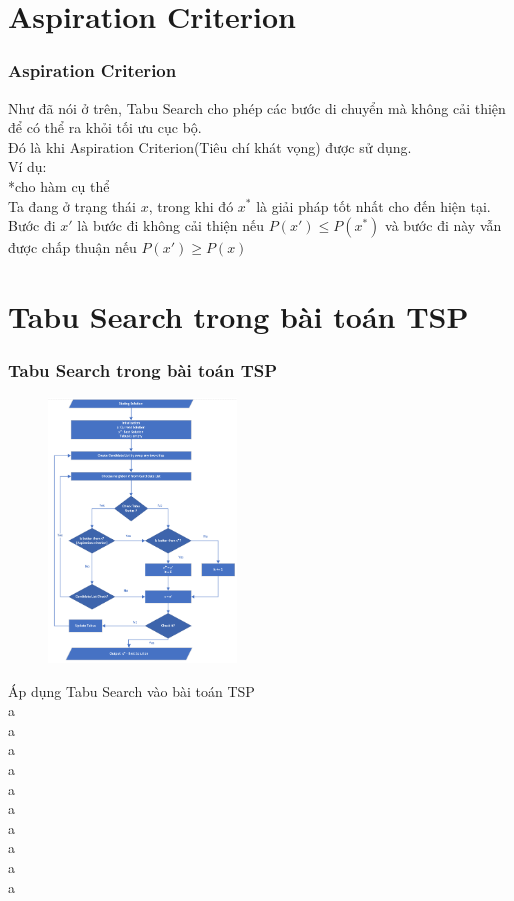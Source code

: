 \documentclass[12pt]{beamer}
\begin{document}
	\section{Aspiration Criterion}
	\begin{frame}
		\frametitle{Aspiration Criterion}
		Như đã nói ở trên, Tabu Search cho phép các bước di chuyển mà không cải thiện để có thể ra khỏi tối ưu cục bộ.\\
		Đó là khi Aspiration Criterion(Tiêu chí khát vọng) được sử dụng.\\
		Ví dụ:\\
		*cho hàm cụ thể\\
		Ta đang ở trạng thái $x$, trong khi đó $x^*$ là giải pháp tốt nhất cho đến hiện tại.\\
		Bước đi $x'$ là bước đi không cải thiện nếu $P(x') \le P(x^*)$ và bước đi này vẫn được chấp thuận nếu $P(x') \ge P(x)$
	\end{frame}

	\section{Tabu Search trong bài toán TSP}
	\begin{frame}
		\frametitle{Tabu Search trong bài toán TSP}
			\begin{figure}
				\includegraphics[width=5cm]{Tabu.png}
			\end{figure}
		Áp dụng Tabu Search vào bài toán TSP\\
		a\\
		a\\
		a\\
		a\\
		a\\
		a\\
		a\\
		a\\
		a\\
		a\\
	\end{frame}
\end{document}
